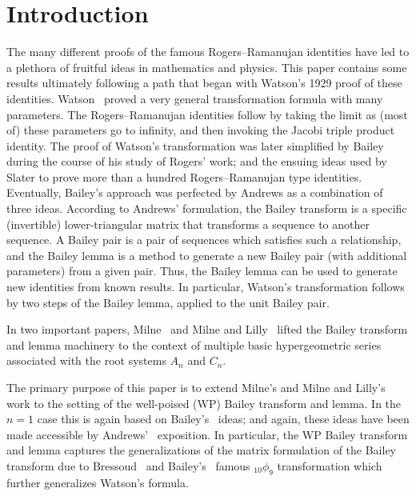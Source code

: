 \documentclass[pdftex]{sigma}
\numberwithin{equation}{section}
\begin{document}
\section{Introduction}
The many different proofs of the famous Rogers--Ramanujan identities have led to a plethora of fruitful ideas in mathematics and physics. This paper contains some results ultimately following a path that began with Watson's 1929 proof of these identities. Watson~\cite{GNW1929} proved a very general transformation formula with many parameters. The Rogers--Ramanujan identities follow by taking the limit as (most of) these parameters go to infinity, and then invoking the Jacobi triple product identity. The proof of Watson's transformation was later simplified by Bailey during the course of his study of Rogers' work; and the ensuing ideas used by Slater to prove more than a hundred Rogers--Ramanujan type identities. Eventually, Bailey's approach was perfected by Andrews as a combination of three ideas. According to Andrews' formulation, the Bailey transform is a specific (invertible) lower-triangular matrix that transforms a sequence to another sequence. A Bailey pair is a pair of sequences which satisfies such a relationship, and the Bailey lemma is a method to generate a new Bailey pair (with additional parameters) from a given pair. Thus, the Bailey lemma can be used to generate new identities from known results. In particular, Watson's transformation follows by two steps of the Bailey lemma, applied to the unit Bailey pair.

In two important papers, Milne~\cite{Milne1997} and Milne and Lilly~\cite{ML1995} lifted the Bailey transform and lemma machinery to the context of multiple basic hypergeometric series associated with the root systems $A_n$ and $C_n$.

The primary purpose of this paper is to extend Milne's and Milne and Lilly's work to the setting of the well-poised (WP) Bailey transform and lemma. In the $n=1$ case this is again based on Bailey's~\cite{WNB1947} ideas; and again, these ideas have been made accessible by Andrews'~\cite{Andrews2001} exposition. In particular, the WP Bailey transform and lemma captures the generalizations of the matrix formulation of the Bailey transform due to Bressoud~\cite{DB1983} and Bailey's~\cite{WNB1929} famous $_{10}\phi_9$ transformation which further generalizes Watson's formula.
\end{document}

